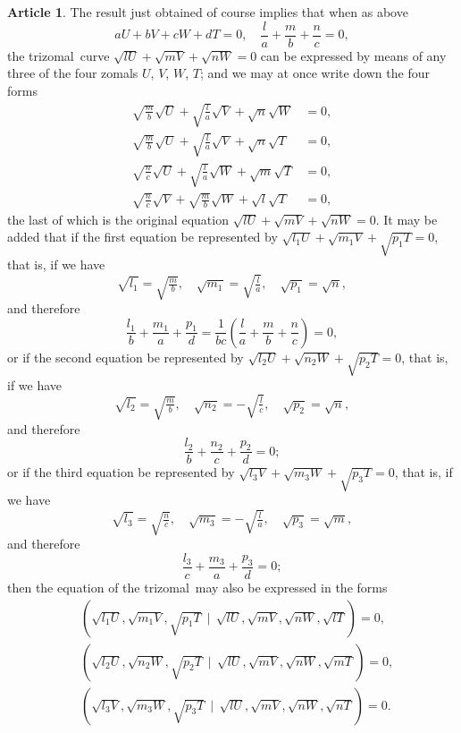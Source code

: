 \documentclass[11pt,a4paper]{article}
\theoremstyle{definition}
\newtheorem{art}{Article}
\newcommand{\trizomal}{trizomal}
\newcommand{\weighted}{\mathbin{\mid}}
\begin{document}
\begin{art}
The result just obtained of course implies that when as above
\[
aU + bV + cW + dT = 0, \quad \frac{l}{a} + \frac{m}{b} + \frac{n}{c} = 0,
\]
the \trizomal\ curve $\sqrt{lU} + \sqrt{mV} + \sqrt{nW} = 0$ can be expressed by means of any three of the four zomals $U$, $V$, $W$, $T$; and we may at once write down the four forms
\begin{align*}
\sqrt{\tfrac{m}{b}}\sqrt{U} + \sqrt{\tfrac{l}{a}}\sqrt{V} + \sqrt{n}\sqrt{W} &= 0, \\
\sqrt{\tfrac{m}{b}}\sqrt{U} + \sqrt{\tfrac{l}{a}}\sqrt{V} + \sqrt{n}\sqrt{T} &= 0, \\
\sqrt{\tfrac{n}{c}}\sqrt{U} + \sqrt{\tfrac{l}{a}}\sqrt{W} + \sqrt{m}\sqrt{T} &= 0, \\
\sqrt{\tfrac{n}{c}}\sqrt{V} + \sqrt{\tfrac{m}{b}}\sqrt{W} + \sqrt{l}\sqrt{T} &= 0,
\end{align*}
the last of which is the original equation $\sqrt{lU} + \sqrt{mV} + \sqrt{nW} = 0$. It may be added that if the first equation be represented by $\sqrt{l_{1}U} + \sqrt{m_{1}V} + \sqrt{p_{1}T} = 0$, that is, if we have
\[
\sqrt{l_{1}} = \sqrt{\tfrac{m}{b}}, \quad \sqrt{m_{1}} = \sqrt{\tfrac{l}{a}}, \quad \sqrt{p_{1}} = \sqrt{n},
\]
and therefore
\[
\frac{l_{1}}{b} + \frac{m_{1}}{a} + \frac{p_{1}}{d} = \frac{1}{bc}\left(\frac{l}{a} + \frac{m}{b} + \frac{n}{c}\right) = 0,
\]
or if the second equation be represented by $\sqrt{l_{2}U} + \sqrt{n_{2}W} + \sqrt{p_{2}T} = 0$, that is, if we have
\[
\sqrt{l_{2}} = \sqrt{\tfrac{m}{b}}, \quad \sqrt{n_{2}} = -\sqrt{\tfrac{l}{c}}, \quad \sqrt{p_{2}} = \sqrt{n},
\]
and therefore
\[
\frac{l_{2}}{b} + \frac{n_{2}}{c} + \frac{p_{2}}{d} = 0;
\]
or if the third equation be represented by $\sqrt{l_{3}V} + \sqrt{m_{3}W} + \sqrt{p_{3}T} = 0$, that is, if we have
\[
\sqrt{l_{3}} = \sqrt{\tfrac{n}{c}}, \quad \sqrt{m_{3}} = -\sqrt{\tfrac{l}{a}}, \quad \sqrt{p_{3}} = \sqrt{m},
\]
and therefore
\[
\frac{l_{3}}{c} + \frac{m_{3}}{a} + \frac{p_{3}}{d} = 0;
\]
then the equation of the \trizomal\ may also be expressed in the forms
\begin{align*}
&(\sqrt{l_{1}U}, \sqrt{m_{1}V}, \sqrt{p_{1}T} \,\weighted\, \sqrt{lU}, \sqrt{mV}, \sqrt{nW}, \sqrt{lT}) = 0, \\
&(\sqrt{l_{2}U}, \sqrt{n_{2}W}, \sqrt{p_{2}T} \,\weighted\, \sqrt{lU}, \sqrt{mV}, \sqrt{nW}, \sqrt{mT}) = 0, \\
&(\sqrt{l_{3}V}, \sqrt{m_{3}W}, \sqrt{p_{3}T} \,\weighted\, \sqrt{lU}, \sqrt{mV}, \sqrt{nW}, \sqrt{nT}) = 0.
\end{align*}
\end{art}
\end{document}
